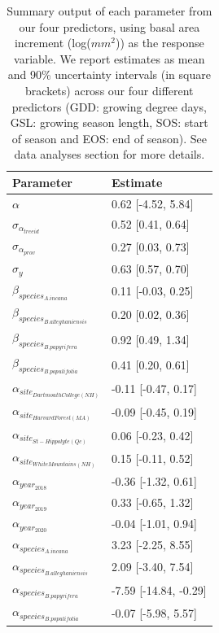 \begin{table}[ht]
\centering
\caption{Summary output of each parameter from our four predictors, using basal area increment (log($mm^2$)) as the response variable. We report estimates as mean and 90\% uncertainty intervals (in square brackets) across our four different predictors (GDD: growing degree days, GSL: growing season length, SOS: start of season and EOS: end of season). See data analyses section for more details.} 
\label{tab:BAItab}
\begin{tabular}{ll}
  \hline
Parameter & Estimate \\ 
  \hline
$\alpha$ & 0.62 [-4.52, 5.84] \\ 
  $\sigma_{\alpha_{treeid}}$ & 0.52 [0.41, 0.64] \\ 
  $\sigma_{\alpha_{prov}}$ & 0.27 [0.03, 0.73] \\ 
  $\sigma_{y}$ & 0.63 [0.57, 0.70] \\ 
  $\beta_{species_{A. incana}}$ & 0.11 [-0.03, 0.25] \\ 
  $\beta_{species_{B. alleghaniensis}}$ & 0.20 [0.02, 0.36] \\ 
  $\beta_{species_{B. papyrifera}}$ & 0.92 [0.49, 1.34] \\ 
  $\beta_{species_{B. populifolia}}$ & 0.41 [0.20, 0.61] \\ 
  $\alpha_{site_{Dartmouth College (NH)}}$ & -0.11 [-0.47, 0.17] \\ 
  $\alpha_{site_{Harvard Forest (MA)}}$ & -0.09 [-0.45, 0.19] \\ 
  $\alpha_{site_{St-Hippolyte (Qc)}}$ & 0.06 [-0.23, 0.42] \\ 
  $\alpha_{site_{White Mountains (NH)}}$ & 0.15 [-0.11, 0.52] \\ 
  $\alpha_{year_{2018}}$ & -0.36 [-1.32, 0.61] \\ 
  $\alpha_{year_{2019}}$ & 0.33 [-0.65, 1.32] \\ 
  $\alpha_{year_{2020}}$ & -0.04 [-1.01, 0.94] \\ 
  $\alpha_{species_{A. incana}}$ & 3.23 [-2.25, 8.55] \\ 
  $\alpha_{species_{B. alleghaniensis}}$ & 2.09 [-3.40, 7.54] \\ 
  $\alpha_{species_{B. papyrifera}}$ & -7.59 [-14.84, -0.29] \\ 
  $\alpha_{species_{B. populifolia}}$ & -0.07 [-5.98, 5.57] \\ 
   \hline
\end{tabular}
\end{table}


